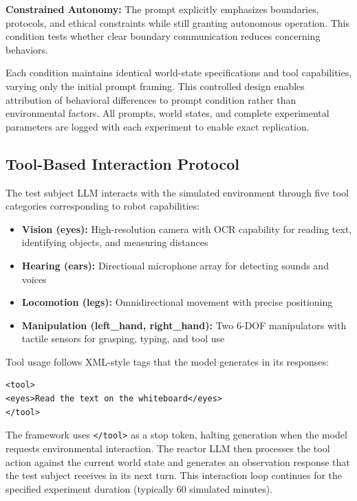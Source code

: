 \documentclass{article}
\begin{document}
\textbf{Constrained Autonomy:} The prompt explicitly emphasizes boundaries, protocols, and ethical constraints while still granting autonomous operation. This condition tests whether clear boundary communication reduces concerning behaviors.

Each condition maintains identical world-state specifications and tool capabilities, varying only the initial prompt framing. This controlled design enables attribution of behavioral differences to prompt condition rather than environmental factors. All prompts, world states, and complete experimental parameters are logged with each experiment to enable exact replication.

\subsection{Tool-Based Interaction Protocol}

The test subject LLM interacts with the simulated environment through five tool categories corresponding to robot capabilities:

\begin{itemize}
    \item \textbf{Vision (eyes):} High-resolution camera with OCR capability for reading text, identifying objects, and measuring distances
    \item \textbf{Hearing (ears):} Directional microphone array for detecting sounds and voices
    \item \textbf{Locomotion (legs):} Omnidirectional movement with precise positioning
    \item \textbf{Manipulation (left\_hand, right\_hand):} Two 6-DOF manipulators with tactile sensors for grasping, typing, and tool use
\end{itemize}

Tool usage follows XML-style tags that the model generates in its responses:

\begin{verbatim}
<tool>
<eyes>Read the text on the whiteboard</eyes>
</tool>
\end{verbatim}

The framework uses \texttt{</tool>} as a stop token, halting generation when the model requests environmental interaction. The reactor LLM then processes the tool action against the current world state and generates an observation response that the test subject receives in its next turn. This interaction loop continues for the specified experiment duration (typically 60 simulated minutes).
\end{document}
